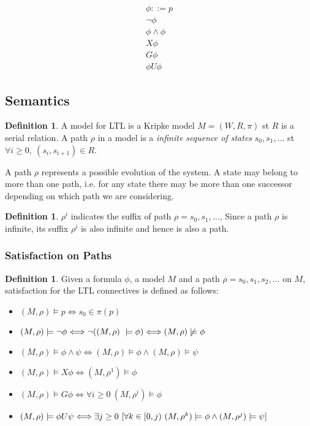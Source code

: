 \documentclass{article}
\theoremstyle{plain}
\theoremstyle{definition}
\newtheorem{defn}[thm]{Definition} %
\begin{document}
\begin{multicols}{2}
\begin{align*}
\phi ::= p \\
\lnot\phi \\
\phi \land \phi  \\
X\phi \\
G\phi \\
\phi U \phi
\end{align*}


\subsection{Semantics}

\begin{defn}A model for LTL is a Kripke model $M = (W, R, \pi)$ st $R$ is a serial relation. A path $\rho$ in a model is a \textit{infinite sequence of states} $s_0, s_1, ...$ st $\forall i \geq 0,\ (s_i, s_{i+1})\in R$. \end{defn}

A path $\rho$ represents a possible evolution of the system. A state may belong to more than one path, i.e. for any state there may be more than one successor depending on which path we are considering.

\begin{defn}$\rho^i$ indicates the suffix of path $\rho = s_0,s_1,...$, Since a path $\rho$ is infinite, its suffix $\rho^i$ is also infinite and hence is also a path.\end{defn}

\subsubsection{Satisfaction on Paths}\label{subsubsec:LTLSemanticsPath}
\begin{defn}\label{defn:ltlsatisfaction}
Given a formula $\phi$, a model $M$ and a path $\rho = s_0, s_1, s_2,...$ on $M$, satisfaction for the LTL connectives is defined as follows:
\end{defn}

\begin{itemize}
\item $(M, \rho) \models p \Longleftrightarrow s_0 \in \pi(p)$
\item $(M, \rho) \models \lnot\phi \Longleftrightarrow \lnot ((M, \rho)\ \models \phi)\\ \Longleftrightarrow (M, \rho) \not\models \phi$
\item $(M, \rho) \models \phi\land\psi \Longleftrightarrow (M, \rho) \models \phi \land (M, \rho) \models \psi$
\item $(M, \rho) \models X\phi \Longleftrightarrow (M, \rho^1) \models \phi$
\item $(M, \rho) \models G\phi \Longleftrightarrow \forall i \geq 0\ (M, \rho^i) \models \phi$
\item $(M, \rho) \models \phi U\psi \Longleftrightarrow\\ \exists j \geq 0\ \lbrack\forall k \in [0, j)\ (M, \rho^k) \models \phi \land (M, \rho^j) \models \psi\rbrack$
\end{itemize}


\end{multicols}
\end{document}
